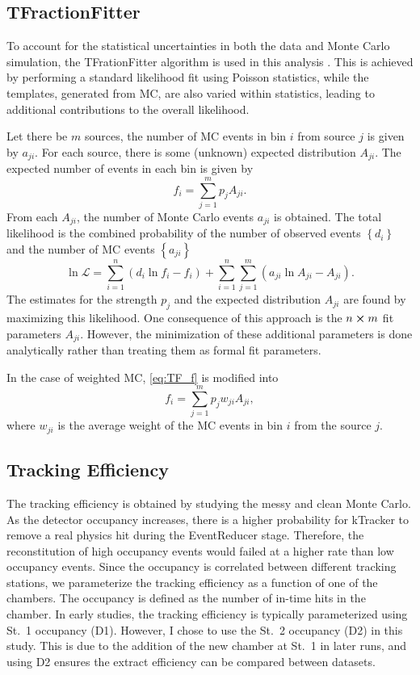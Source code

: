 \documentclass[../main.tex]{subfiles}
\begin{document}
\subsection{TFractionFitter}
To account for the statistical uncertainties in both the data and Monte Carlo
simulation, the TFrationFitter algorithm is used in this analysis \cite{barlow1993}.
This is achieved by performing a standard likelihood fit using Poisson statistics,
while the templates, generated from MC, are also varied within statistics, leading
to additional contributions to the overall likelihood.

Let there be $m$ sources, the number of MC events in bin $i$ from source $j$
is given by $a_{ji}$. For each source, there is some (unknown) expected distribution
$A_{ji}$. The expected number of events in each bin is given by
\begin{equation}
	f_i = \sum^m_{j=1} p_j A_{ji}.
	\label{eq:TF_f}
\end{equation}
From each $A_{ji}$, the number of Monte Carlo events $a_{ji}$ is obtained.
The total likelihood is the combined probability of the number of observed events $\left\{d_i\right\}$
and the number of MC events $\left\{a_{ji}\right\}$
\begin{equation}
	\ln \mathcal{L} = \sum^n_{i=1} \left(d_i \ln f_i -f_i\right) + \sum^n_{i=1} \sum^m_{j=1} \left(a_{ji} \ln A_{ji} - A_{ji}\right).
	\label{eq:TF_likelihood}
\end{equation}
The estimates for the strength $p_j$ and the expected distribution $A_{ji}$ are
found by maximizing this likelihood. One consequence of this approach is the
$n \cross m$ fit parameters $A_{ji}$. However, the  minimization of these additional
parameters is done analytically rather than treating them as formal fit parameters.

In the case of weighted MC, \cref{eq:TF_f} is modified into
\begin{equation}
	f_i = \sum^m_{j=1} p_j w_{ji}A_{ji},
\end{equation}
where $w_{ji}$ is the average weight of the MC events in bin $i$ from the source $j$.

\subsection{Tracking Efficiency}
The tracking efficiency is obtained by studying the messy and clean Monte Carlo.
As the detector occupancy increases, there is a higher probability for kTracker to
remove a real physics hit during the EventReducer stage. Therefore, the reconstitution of high occupancy
events would failed at a higher rate than low occupancy events. Since the occupancy
is correlated between different tracking stations, we parameterize the tracking efficiency
as a function of one of the chambers. The occupancy is defined as the number of
in-time hits in the chamber. In early studies, the tracking efficiency is
typically parameterized using St.~1 occupancy (D1). 
However, I chose to use the St.~2 occupancy (D2) in this study. This
is due to the addition of the new chamber at St.~1 in later runs, and using D2 ensures the
extract efficiency can be compared between datasets. 
\end{document}
